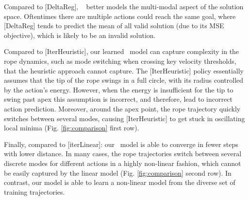 Compared to [DeltaReg], \names~ better models the multi-modal aspect of the solution space.
Oftentimes there are multiple actions could reach the same goal, where [DeltaReg] tends to predict the mean of all valid solution (due to its MSE objective), which is likely to be an invalid solution. 



Compared to [IterHeuristic], our learned \names~model can capture complexity in the rope dynamics, such as mode switching when crossing key velocity thresholds, that the heuristic approach cannot capture. The [IterHeuristic] policy essentially assumes that the tip of the rope swings in a full circle, with its radius controlled by the action's energy. However, when the energy is insufficient for the tip to swing past apex this assumption is incorrect, and therefore, lead to incorrect action prediction. 
Moreover, around the apex point, the rope trajectory quickly switches between several modes, causing [IterHeuristic] to get stuck in oscillating local minima (Fig. \ref{fig:comparison} first row).

Finally, compared to [iterLinear]: our \names~model is able to converge in fewer steps with lower distance. In many cases, the rope trajectories switch between several discrete modes for different actions in a highly non-linear fashion, which cannot be easily captured by the linear model (Fig. \ref{fig:comparison}  second row). In contrast, our model is able to learn a non-linear model from the diverse set of training trajectories. 


